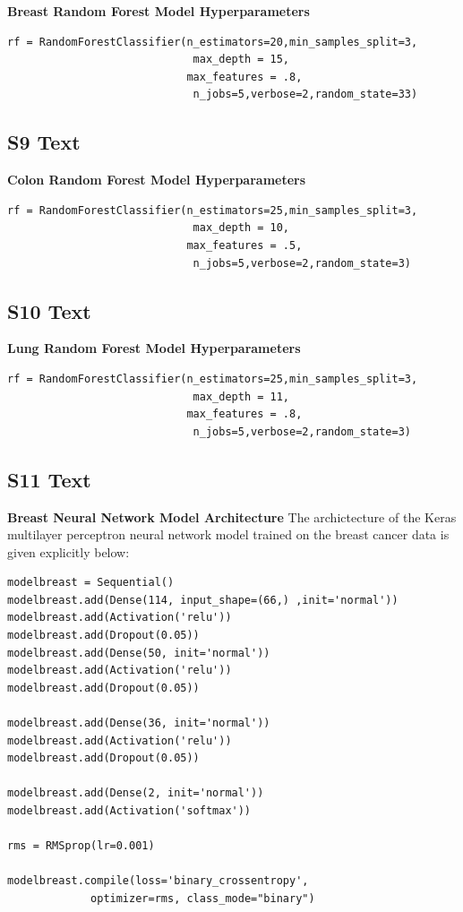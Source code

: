 \documentclass[10pt,letterpaper]{article}
\begin{document}
{\bf Breast Random Forest Model Hyperparameters}
\begin{verbatim}
rf = RandomForestClassifier(n_estimators=20,min_samples_split=3,
                             max_depth = 15,
                            max_features = .8,
                             n_jobs=5,verbose=2,random_state=33)
\end{verbatim}




\subsection*{S9 Text}
\label{S9_Text}
{\bf Colon Random Forest Model Hyperparameters}

\begin{verbatim}
rf = RandomForestClassifier(n_estimators=25,min_samples_split=3,
                             max_depth = 10,
                            max_features = .5,
                             n_jobs=5,verbose=2,random_state=3)
\end{verbatim}



\subsection*{S10 Text}
\label{S10_Text}
{\bf Lung Random Forest Model Hyperparameters}


\begin{verbatim}
rf = RandomForestClassifier(n_estimators=25,min_samples_split=3,
                             max_depth = 11,
                            max_features = .8,
                             n_jobs=5,verbose=2,random_state=3)
\end{verbatim}




\subsection*{S11 Text}
\label{S11_Text}
{\bf Breast Neural Network Model Architecture}
The archictecture of the Keras multilayer perceptron neural network model 
trained on the breast cancer data is given explicitly below:

\begin{verbatim}
modelbreast = Sequential()
modelbreast.add(Dense(114, input_shape=(66,) ,init='normal'))
modelbreast.add(Activation('relu'))
modelbreast.add(Dropout(0.05))
modelbreast.add(Dense(50, init='normal'))
modelbreast.add(Activation('relu'))
modelbreast.add(Dropout(0.05))

modelbreast.add(Dense(36, init='normal'))
modelbreast.add(Activation('relu'))
modelbreast.add(Dropout(0.05))

modelbreast.add(Dense(2, init='normal'))
modelbreast.add(Activation('softmax'))

rms = RMSprop(lr=0.001)

modelbreast.compile(loss='binary_crossentropy', 
             optimizer=rms, class_mode="binary")

\end{verbatim}
\end{document}
